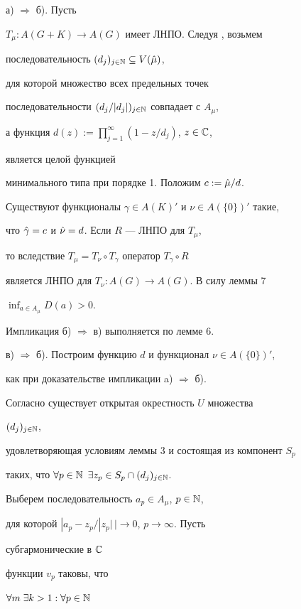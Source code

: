 \begin{pf} а) $\Rightarrow$ б). Пусть 


$T_\mu :A(G+K)\to A(G)$ имеет ЛНПО. Следуя \cite{Kor3}, возьмем 


последовательность $(d_j)_{j\in\Bbb N}\subseteq V(\Hat \mu)$, 


для которой множество всех предельных точек 


последовательности $(d_j/|d_j|)_{j\in\Bbb N}$ совпадает с $A_\mu$, 


а функция $d(z):=\prod^\infty_{j=1}(1-z/d_j)$, $z\in\Bbb C$,


является целой функцией 


минимального типа при порядке 1. Положим $c:=\Hat\mu/d$. 


Существуют функционалы $\gamma\in A(K)'$ и $\nu\in A(\{0\})'$ такие, 


что $\Hat\gamma=c$ и $\Hat\nu=d$. Если $R$ --- ЛНПО для $T_\mu$, 


то вследствие $T_\mu=T_\nu\circ T_\gamma$ оператор $T_\gamma\circ R$ 


является ЛНПО для $T_\nu :A(G)\to A(G)$. В силу леммы 7 


$\inf_{a\in A_\mu}D(a)>0$. 


 


Импликация б) $\Rightarrow$ в) выполняется по лемме 6. 


 


в) $\Rightarrow$ б). Построим функцию $d$ и функционал $\nu\in A(\{0\})'$, 


как при доказательстве импликации a) $\Rightarrow$ б). 


Согласно \cite{Lev} существует открытая окрестность $U$ множества 


$(d_j)_{j\in\Bbb N}$, 


удовлетворяющая условиям леммы 3 и состоящая из компонент $S_p$ 


таких, что $\forall p\in\Bbb N$ $\exists z_p\in S_p\cap(d_j)_{j\in\Bbb N}$. 


Выберем последовательность $a_p\in A_\mu$, $p\in\Bbb N$, 


для которой $|a_p-z_p/|z_p|\,|\to 0$, $p\to\infty$. Пусть 


субгармонические в $\Bbb C$ 


функции $v_p$ таковы, что 


$\forall m\;\exists k>1:\forall p\in\Bbb N$ 



\end{pf}
